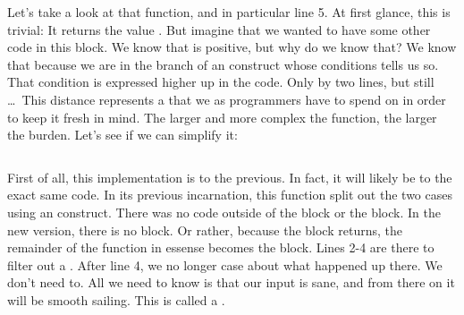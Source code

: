 Let's take a look at that  function, and in particular line 5. At first glance, this is trivial: It returns the value . But imagine that we wanted to have some other code in this block. We know that  is positive, but why do we know that? We know that because we are in the  branch of an  construct whose conditions tells us so. That condition is expressed higher up in the code. Only by two lines, but still \ldots\ This distance represents a  that we as programmers have to spend  on in order to keep it fresh in mind. The larger and more complex the function, the larger the burden. Let's see if we can simplify it:

\inputminted[lastline=7,linenos=true]{csharp}{../src/csharp/functions/guard/Program.cs}

First of all, this implementation is  to the previous. In fact, it will likely be  to the exact same code. In its previous incarnation, this function split out the two cases using an  construct. There was no code outside of the  block or the  block. In the new version, there is no  block. Or rather, because the  block returns, the remainder of the function in essense becomes the  block. Lines 2-4 are there to filter out a . After line 4, we no longer case about what happened up there. We don't need to. All we need to know is that our input is sane, and from there on it will be smooth sailing. This is called a .

